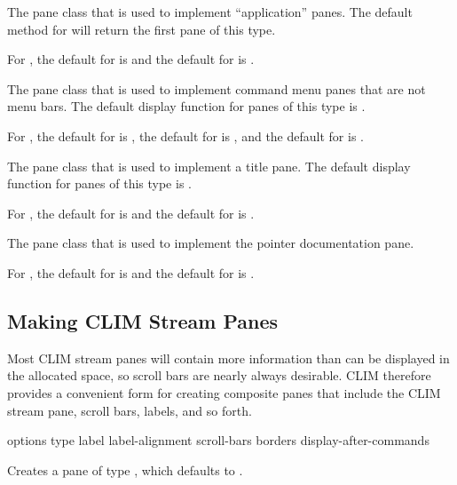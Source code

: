 
The pane class that is used to implement ``application'' panes.  The default
method for  will return the first pane of this type.

For , the default for  is
 and the default for  is .


The pane class that is used to implement command menu panes that are not menu
bars.  The default display function for panes of this type is
.

For , the default for  is
, the default for  is , and
the default for  is .


The pane class that is used to implement a title pane.  The default display
function for panes of this type is .

For , the default for  is  and the
default for  is .


The pane class that is used to implement the pointer documentation pane.

For , the default for  is
 and the default for  is .


\subsection {Making CLIM Stream Panes}

Most CLIM stream panes will contain more information than can be displayed
in the allocated space, so scroll bars are nearly always desirable.  CLIM
therefore provides a convenient form for creating composite panes that include
the CLIM stream pane, scroll bars, labels, and so forth.

 {\rest options
                                \key type label label-alignment scroll-bars borders
                                     display-after-commands \allow}

Creates a pane of type , which defaults to .

